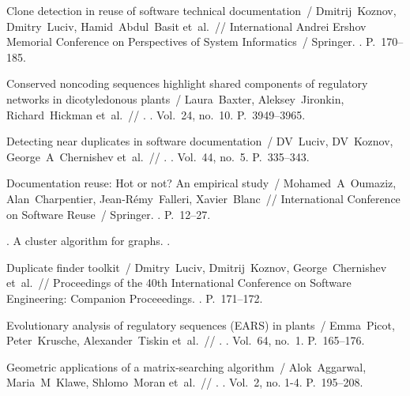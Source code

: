 \begin{thebibliography}{10}
Clone detection in reuse of software technical documentation~/ Dmitrij~Koznov,
  Dmitry~Luciv, Hamid~Abdul~Basit et~al.~// International Andrei Ershov
  Memorial Conference on Perspectives of System Informatics~/ Springer.
  \BibDash
{}. \BibDash
\newblock P.~170--185.

Conserved noncoding sequences highlight shared components of regulatory
  networks in dicotyledonous plants~/ Laura~Baxter, Aleksey~Jironkin,
  Richard~Hickman et~al.~// . \BibDash
{}. \BibDash
\newblock Vol.~24, no.~10. \BibDash
\newblock P.~3949--3965.

Detecting near duplicates in software documentation~/ DV~Luciv, DV~Koznov,
  George~A~Chernishev et~al.~// .
  \BibDash
{}. \BibDash
\newblock Vol.~44, no.~5. \BibDash
\newblock P.~335--343.

Documentation reuse: Hot or not? An empirical study~/ Mohamed~A~Oumaziz,
  Alan~Charpentier, Jean-R{\'e}my~Falleri, Xavier~Blanc~// International
  Conference on Software Reuse~/ Springer. \BibDash
{}. \BibDash
\newblock P.~12--27.

. A cluster algorithm for graphs. \BibDash
{}.

Duplicate finder toolkit~/ Dmitry~Luciv, Dmitrij~Koznov, George~Chernishev
  et~al.~// Proceedings of the 40th International Conference on Software
  Engineering: Companion Proceeedings. \BibDash
{}. \BibDash
\newblock P.~171--172.

Evolutionary analysis of regulatory sequences (EARS) in plants~/ Emma~Picot,
  Peter~Krusche, Alexander~Tiskin et~al.~// .
  \BibDash
{}. \BibDash
\newblock Vol.~64, no.~1. \BibDash
\newblock P.~165--176.

Geometric applications of a matrix-searching algorithm~/ Alok~Aggarwal,
  Maria~M~Klawe, Shlomo~Moran et~al.~// . \BibDash
{}. \BibDash
\newblock Vol.~2, no. 1-4. \BibDash
\newblock P.~195--208.


\end{thebibliography}
